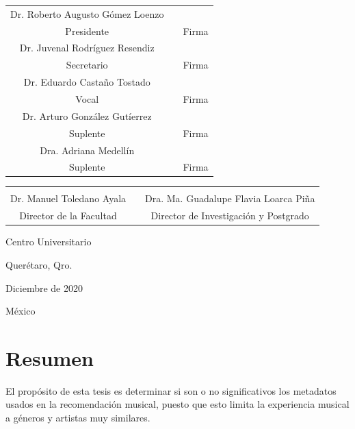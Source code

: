 \noindent\begin{tabularx}{\textwidth}{cXc}
Dr. Roberto Augusto G\'omez Loenzo & & \hspace{1.5in} \\ \cline{1-1} \cline{3-3}
Presidente         & & Firma          \\[0.1in]
Dr. Juvenal Rodr\'iguez Resendiz  & & \hspace{1.5in} \\ \cline{1-1} \cline{3-3}
Secretario         & & Firma          \\[0.1in]
Dr. Eduardo Casta\~no Tostado   & & \hspace{1.5in} \\ \cline{1-1} \cline{3-3}
Vocal         & & Firma          \\[0.1in]
Dr. Arturo Gonz\'alez Gut\'ierrez 
                                 & & \hspace{1.5in} \\ \cline{1-1} \cline{3-3}
Suplente         & & Firma          \\[0.1in]
Dra. Adriana Medell\'in & & \hspace{1.5in} \\ \cline{1-1} \cline{3-3}
Suplente         & & Firma          \\[0.1in]
\end{tabularx}
\noindent\begin{tabularx}{\textwidth}{cXc}
\hspace{2.25in} & & \hspace{2.75in} \\[0.25in] \cline{1-1} \cline{3-3}
Dr. Manuel Toledano Ayala & & Dra. Ma. Guadalupe Flavia Loarca Pi\~na             \\
Director de la Facultad   & & Director de Investigaci\'on y Postgrado
\end{tabularx}
\begin{center}
Centro Universitario\par
Quer\'etaro, Qro.\par
Diciembre de 2020\par
{\large M\'exico}
\end{center}
\egroup%
\cleardoublepage
\setcounter{page}{1}
\chapter{Resumen}
\doublespacing
El propósito de esta tesis es determinar si son o no significativos los metadatos usados en la recomendación musical, puesto que esto limita la experiencia musical a géneros y artistas muy similares. 

